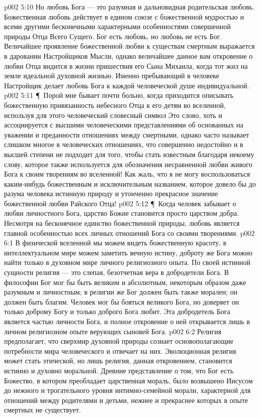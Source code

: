 \vs p002 5:10 Но любовь Бога --- это разумная и дальновидная родительская любовь. Божественная любовь действует в едином союзе с божественной мудростью и всеми другими бесконечными характерными особенностями совершенной природы Отца Всего Сущего. Бог есть любовь, но любовь не есть Бог. Величайшее проявление божественной любви к существам смертным выражается в даровании Настройщиков Мысли, однако величайшее данное вам откровение о любви Отца видится в жизни пришествия его Сына Михаила, когда тот жил на земле идеальной духовной жизнью. Именно пребывающий в человеке Настройщик делает любовь Бога к каждой человеческой душе индивидуальной.
\vs p002 5:11 \P\ Порой мне бывает почти больно, когда приходится описывать божественную привязанность небесного Отца к его детям во вселенной, используя для этого человеческий словесный символ  Это слово, хоть и ассоциируется с высшими человеческими представлениями об основанных на уважении и преданности отношениях между смертными, однако часто называет слишком многое в человеческих отношениях, что совершенно недостойно и в высшей степени не подходит для того, чтобы стать известным благодаря некоему слову, которое также используется для обозначения несравненной любви живого Бога к своим творениям во вселенной! Как жаль, что я не могу воспользоваться каким\hyp{}нибудь божественным и исключительным названием, которое довело бы до разума человека истинную природу и утонченно прекрасное значение божественной любви Райского Отца!
\vs p002 5:12 \P\ Когда человек забывает о любви личностного Бога, царство Божие становится просто царством добра. Несмотря на бесконечное единство божественной природы, любовь является главной особенностью всех личных отношений Бога со своими творениями.
\vs p002 6:1 В физической вселенной мы можем видеть божественную красоту, в интеллектуальном мире можем заметить вечную истину, доброту же Бога можно найти только в духовном мире личного религиозного опыта. По своей истинной сущности религия --- это слепая, безотчетная вера в добродетели Бога. В философии Бог мог бы быть великим и абсолютным, некоторым образом даже разумным и личностным; в религии же Бог должен быть также морален; он должен быть благим. Человек мог бы бояться великого Бога, но доверяет он только доброму Богу и только доброго Бога любит. Эта добродетель Бога является частью личности Бога, и полное откровение о ней открывается лишь в личном религиозном опыте верующих сыновей Бога.
\vs p002 6:2 Религия предполагает, что сверхмир духовной природы сознает основополагающие потребности мира человеческого и отвечает на них. Эволюционная религия может стать этической, но лишь религия, данная откровением, становится истинно и духовно моральной. Древние представление о том, что Бог есть Божество, в котором преобладает царственная мораль, было возвышено Иисусом до нежного и трогательного уровня интимно\hyp{}семейной морали, характерной для отношений между родителями и детьми, нежнее и прекраснее которых в опыте смертных не существует.

